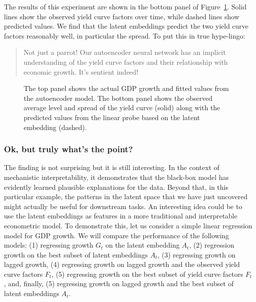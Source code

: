 \documentclass{article}
\theoremstyle{plain}
\theoremstyle{definition}
\theoremstyle{remark}
\begin{document}
The results of this experiment are shown in the bottom panel of
Figure~\ref{fig-dl-results}. Solid lines show the observed yield curve
factors over time, while dashed lines show predicted values. We find
that the latent embeddings predict the two yield curve factors
reasonably well, in particular the spread. To put this in true
hype-lingo:

\begin{quote}
Not just a parrot! Our autoencoder neural network has an implicit
understanding of the yield curve factors and their relationship with
economic growth. It's sentient indeed!
\end{quote}

\begin{figure}


\caption{\label{fig-dl-results}The top panel shows the actual GDP growth
and fitted values from the autoencoder model. The bottom panel shows the
observed average level and spread of the yield curve (solid) along with
the predicted values from the linear probe based on the latent embedding
(dashed).}

\end{figure}%

\subsubsection{Ok, but truly what's the
point?}\label{ok-but-truly-whats-the-point}

The finding is not surprising but it is still interesting. In the
context of mechanistic interpretability, it demonstrates that the
black-box model has evidently learned plausible explanations for the
data. Beyond that, in this particular example, the patterns in the
latent space that we have just uncovered might actually be useful for
downstream tasks. An interesting idea could be to use the latent
embeddings as features in a more traditional and interpretable
econometric model. To demonstrate this, let us consider a simple linear
regression model for GDP growth. We will compare the performance of the
following models: (1) regressing growth \(G_t\) on the latent embedding
\(A_t\), (2) regression growth on the best subset of latent embeddings
\(A_t\), (3) regressing growth on lagged growth, (4) regressing growth
on lagged growth and the observed yield curve factors \(F_t\), (5)
regressing growth on the best subset of yield curve factors \(F_t\),
and, finally, (5) regressing growth on lagged growth and the best subset
of latent embeddings \(A_t\).
\end{document}

